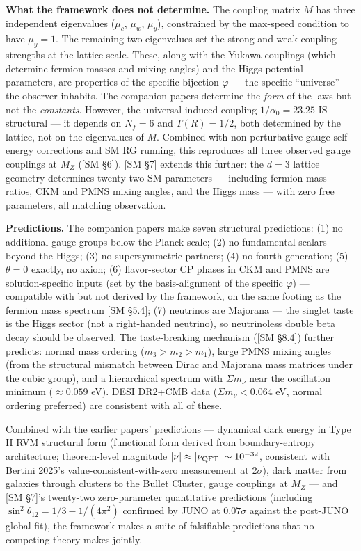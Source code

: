 \documentclass[
]{article}
\begin{document}
\textbf{What the framework does not determine.} The coupling matrix
\(M\) has three independent eigenvalues (\(\mu_c\), \(\mu_w\),
\(\mu_y\)), constrained by the max-speed condition to have
\(\mu_y = 1\). The remaining two eigenvalues set the strong and weak
coupling strengths at the lattice scale. These, along with the Yukawa
couplings (which determine fermion masses and mixing angles) and the
Higgs potential parameters, are properties of the specific bijection
\(\varphi\) --- the specific ``universe'' the observer inhabits. The
companion papers determine the \emph{form} of the laws but not the
\emph{constants}. However, the universal induced coupling
\(1/\alpha_0 = 23.25\) IS structural --- it depends on \(N_f = 6\) and
\(T(R) = 1/2\), both determined by the lattice, not on the eigenvalues
of \(M\). Combined with non-perturbative gauge self-energy corrections
and SM RG running, this reproduces all three observed gauge couplings at
\(M_Z\) ({[}SM §6{]}). {[}SM §7{]} extends this further: the \(d = 3\)
lattice geometry determines twenty-two SM parameters --- including
fermion mass ratios, CKM and PMNS mixing angles, and the Higgs mass ---
with zero free parameters, all matching observation.

\textbf{Predictions.} The companion papers make seven structural
predictions: (1) no additional gauge groups below the Planck scale; (2)
no fundamental scalars beyond the Higgs; (3) no supersymmetric partners;
(4) no fourth generation; (5) \(\bar{\theta} = 0\) exactly, no axion;
(6) flavor-sector CP phases in CKM and PMNS are solution-specific inputs
(set by the basis-alignment of the specific \(\varphi\)) --- compatible
with but not derived by the framework, on the same footing as the
fermion mass spectrum {[}SM §5.4{]}; (7) neutrinos are Majorana --- the
singlet taste is the Higgs sector (not a right-handed neutrino), so
neutrinoless double beta decay should be observed. The taste-breaking
mechanism ({[}SM §8.4{]}) further predicts: normal mass ordering
(\(m_3 > m_2 > m_1\)), large PMNS mixing angles (from the structural
mismatch between Dirac and Majorana mass matrices under the cubic
group), and a hierarchical spectrum with \(\Sigma m_\nu\) near the
oscillation minimum (\(\approx 0.059\) eV). DESI DR2+CMB data
(\(\Sigma m_\nu < 0.064\) eV, normal ordering preferred) are consistent
with all of these.

Combined with the earlier papers' predictions --- dynamical dark energy
in Type II RVM structural form (functional form derived from
boundary-entropy architecture; theorem-level magnitude
\(|\nu| \approx |\nu_{\rm QFT}| \sim 10^{-32}\), consistent with Bertini
2025's value-consistent-with-zero measurement at \(2\sigma\)), dark
matter from galaxies through clusters to the Bullet Cluster, gauge
couplings at \(M_Z\) --- and {[}SM §7{]}'s twenty-two zero-parameter
quantitative predictions (including
\(\sin^2\theta_{12} = 1/3 - 1/(4\pi^2)\) confirmed by JUNO at
\(0.07\sigma\) against the post-JUNO global fit), the framework makes a
suite of falsifiable predictions that no competing theory makes jointly.
\end{document}
